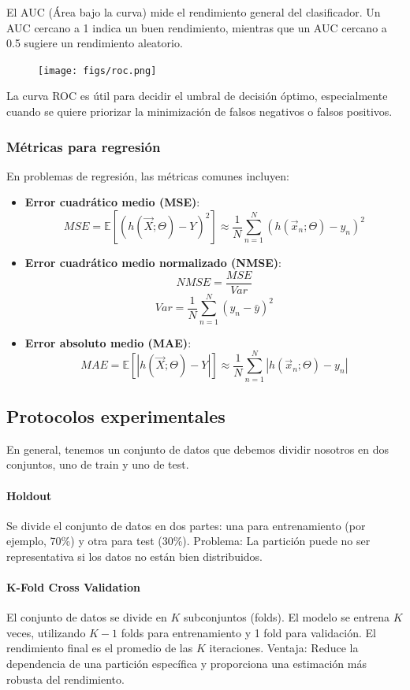 El AUC (Área bajo la curva) mide el rendimiento general del clasificador. Un AUC cercano a 1 indica un buen rendimiento, mientras que un AUC cercano a 0.5 sugiere un rendimiento aleatorio.

\begin{figure}[h]
\centering
\texttt{[image: figs/roc.png]}
\end{figure}

La curva ROC es útil para decidir el umbral de decisión óptimo, especialmente cuando se quiere priorizar la minimización de falsos negativos o falsos positivos.

\subsubsection{Métricas para regresión}
En problemas de regresión, las métricas comunes incluyen:
\begin{itemize}
\item \textbf{Error cuadrático medio (MSE)}:
$$MSE = \mathbb{E}[(h(\vec{X}; \Theta) - Y)^2] \approx \frac{1}{N} \sum^N_{n = 1}(h(\vec{x}_n;\Theta) - y_n)^2$$

\item \textbf{Error cuadrático medio normalizado (NMSE)}:
$$NMSE = \frac{MSE}{Var}$$
$$Var = \frac{1}{N} \sum^N_{n = 1} (y_n - \bar{y})^2$$

\item \textbf{Error absoluto medio (MAE)}:
$$MAE = \mathbb{E}[|h(\vec{X};\Theta) - Y|] \approx \frac{1}{N} \sum^N_{n = 1} |h(\vec{x}_n; \Theta) - y_n|$$
\end{itemize}

\subsection{Protocolos experimentales}
En general, tenemos un conjunto de datos que debemos dividir nosotros en dos conjuntos, uno de train y uno de test. 

\paragraph{Holdout}
Se divide el conjunto de datos en dos partes: una para entrenamiento (por ejemplo, 70\%) y otra para test (30\%). Problema: La partición puede no ser representativa si los datos no están bien distribuidos.

\paragraph{K-Fold Cross Validation}
El conjunto de datos se divide en $K$ subconjuntos (folds). El modelo se entrena $K$ veces, utilizando 
$K-1$ folds para entrenamiento y 1 fold para validación. El rendimiento final es el promedio de las $K$ iteraciones. Ventaja: Reduce la dependencia de una partición específica y proporciona una estimación más robusta del rendimiento.

